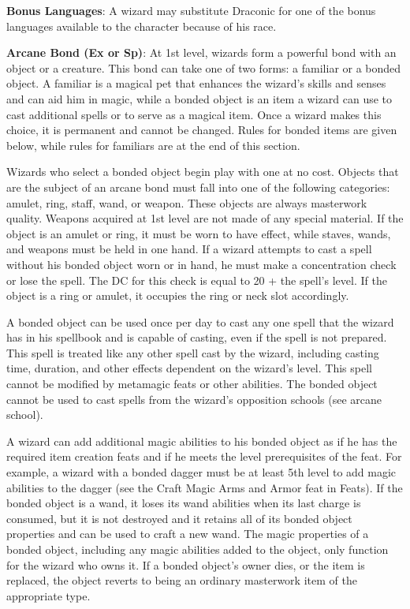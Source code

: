 \textbf{Bonus Languages}: A wizard may substitute Draconic for one of the bonus languages available to the character because of his race.
				
\textbf{Arcane Bond (Ex or Sp)}: At 1st level, wizards form a powerful bond with an object or a creature. This bond can take one of two forms: a familiar or a bonded object. A familiar is a magical pet that enhances the wizard's skills and senses and can aid him in magic, while a bonded object is an item a wizard can use to cast additional spells or to serve as a magical item. Once a wizard makes this choice, it is permanent and cannot be changed. Rules for bonded items are given below, while rules for familiars are at the end of this section.
				
Wizards who select a bonded object begin play with one at no cost. Objects that are the subject of an arcane bond must fall into one of the following categories: amulet, ring, staff, wand, or weapon. These objects are always masterwork quality. Weapons acquired at 1st level are not made of any special material. If the object is an amulet or ring, it must be worn to have effect, while staves, wands, and weapons must be held in one hand. If a wizard attempts to cast a spell without his bonded object worn or in hand, he must make a concentration check or lose the spell. The DC for this check is equal to 20 + the spell's level. If the object is a ring or amulet, it occupies the ring or neck slot accordingly.
				
A bonded object can be used once per day to cast any one spell that the wizard has in his spellbook and is capable of casting, even if the spell is not prepared. This spell is treated like any other spell cast by the wizard, including casting time, duration, and other effects dependent on the wizard's level. This spell cannot be modified by metamagic feats or other abilities. The bonded object cannot be used to cast spells from the wizard's opposition schools (see arcane school).
				
A wizard can add additional magic abilities to his bonded object as if he has the required item creation feats and if he meets the level prerequisites of the feat. For example, a wizard with a bonded dagger must be at least 5th level to add magic abilities to the dagger (see the Craft Magic Arms and Armor feat in Feats). If the bonded object is a wand, it loses its wand abilities when its last charge is consumed, but it is not destroyed and it retains all of its bonded object properties and can be used to craft a new wand. The magic properties of a bonded object, including any magic abilities added to the object, only function for the wizard who owns it. If a bonded object's owner dies, or the item is replaced, the object reverts to being an ordinary masterwork item of the appropriate type.
				
